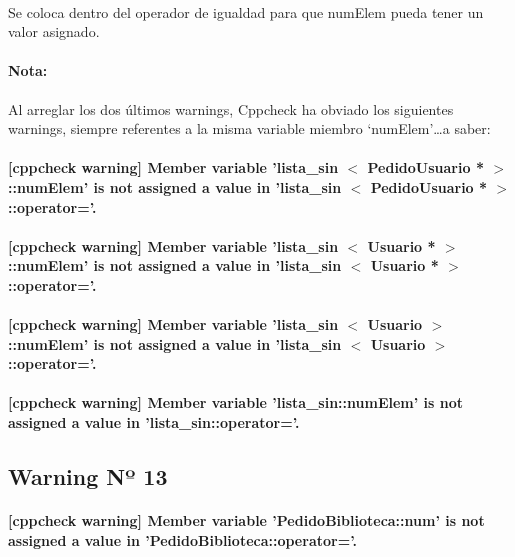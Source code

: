 			\paragraph{}Se coloca dentro del operador de igualdad para que numElem pueda tener un valor asignado.
			
			\paragraph{Nota:}Al arreglar los dos últimos warnings,  Cppcheck ha obviado los siguientes warnings, siempre referentes a la misma variable miembro ‘numElem’…a saber:
			
			\paragraph{[cppcheck warning] Member variable 'lista\_sin $<$ PedidoUsuario * $>$::numElem' is not assigned a value in 'lista\_sin $<$ PedidoUsuario * $>$::operator='.	}
			
			\paragraph{[cppcheck warning] Member variable 'lista\_sin $<$ Usuario * $>$::numElem' is not assigned a value in 'lista\_sin $<$ Usuario * $>$::operator='.}
			
			\paragraph{[cppcheck warning] Member variable 'lista\_sin $<$ Usuario $>$::numElem' is not assigned a value in 'lista\_sin $<$ Usuario $>$::operator='.}
			
			\paragraph{[cppcheck warning] Member variable 'lista\_sin::numElem' is not assigned a value in 'lista\_sin::operator='.}
			
	\subsection{Warning Nº 13}
	
		\paragraph{ [cppcheck warning]  Member variable 'PedidoBiblioteca::num' is not assigned a value in 'PedidoBiblioteca::operator='.}
	
